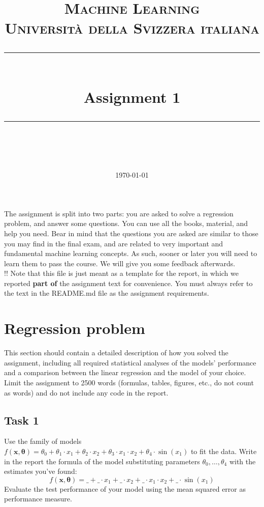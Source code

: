 \documentclass[11pt]{scrartcl}
\title{	
	\normalfont\normalsize
	\textsc{Machine Learning\\%
	Universit\`a della Svizzera italiana}\\
	\vspace{25pt}
	\rule{\linewidth}{0.5pt}\\
	\vspace{20pt}
	{\huge Assignment 1}\\
	\vspace{12pt}
	\rule{\linewidth}{1pt}\\
	\vspace{12pt}
}
\author{\LARGE \thestudent}
\date{\normalsize\today}
\begin{document}
\maketitle

The assignment is split into two parts: you are asked to solve a regression problem, and answer some questions. You can use all the books, material, and help you need. Bear in mind that the questions you are asked are similar to those you may find in the final exam, and are related to very important and fundamental machine learning concepts. As such, sooner or later you will need to learn them to pass the course. We will give you some feedback afterwards.\\

\noindent !! Note that this file is just meant as a template for the report, in which we reported \textbf{part of} the assignment text for convenience. You must always refer to the text in the README.md file as the assignment requirements.


\section{Regression problem}

This section should contain a detailed description of how you solved the assignment, including all required statistical analyses of the models' performance and a comparison between the linear regression and the model of your choice. Limit the assignment to 2500 words (formulas, tables, figures, etc., do not count as words) and do not include any code in the report.

\subsection{Task 1}
Use the family of models $f(\mathbf{x}, \boldsymbol{\theta}) = \theta_0 + \theta_1 \cdot x_1 + \theta_2 \cdot x_2 + \theta_3 \cdot x_1 \cdot x_2 + \theta_4 \cdot \sin(x_1)$ to fit the data. Write in the report the formula of the model substituting parameters $\theta_0, \ldots, \theta_4$ with the estimates you've found:
$$f(\mathbf{x}, \boldsymbol{\theta}) = \_ + \_ \cdot x_1 + \_ \cdot x_2 + \_ \cdot x_1 \cdot x_2 + \_ \cdot \sin(x_1)$$
Evaluate the test performance of your model using the mean squared error as performance measure.
\end{document}
